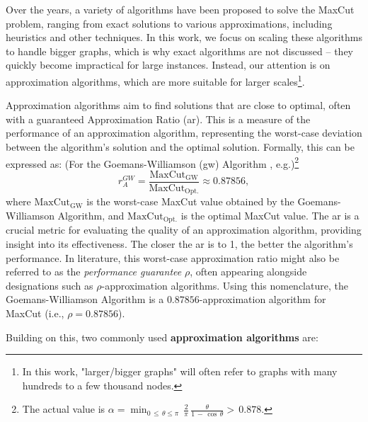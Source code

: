 
Over the years, a variety of algorithms have been proposed to solve the MaxCut problem, ranging from exact solutions to various approximations, including heuristics and other techniques. In this work, we focus on scaling these algorithms to handle bigger graphs, which is why exact algorithms are not discussed – they quickly become impractical for large instances. Instead, our attention is on approximation algorithms, which are more suitable for larger scales\footnote{In this work, "larger/bigger graphs" will often refer to graphs with many hundreds to a few thousand nodes.}.

Approximation algorithms aim to find solutions that are close to optimal, often with a guaranteed Approximation Ratio (\acrshort{ar}). This is a measure of the performance of an approximation algorithm, representing the worst-case deviation between the algorithm's solution and the optimal solution. Formally, this can be expressed as: (For the Goemans-Williamson (\acrshort{gw}) Algorithm \cite{GW-Algorithm}, e.g.)\footnote{The actual value is $\alpha=\operatorname*{min}_{0\,\leq\,\theta\leq\pi}\,\frac{2}{\pi}\,\frac{\theta}{1\,-\,\cos\,\theta} > \,0.878$.}$$r_A^{GW} = \frac{\text{MaxCut}_{\text{GW}}}{\text{MaxCut}_{\text{Opt.}}} \approx 0.87856,$$
where $\text{MaxCut}_{\text{GW}}$ is the worst-case MaxCut value obtained by the Goemans-Williamson Algorithm, and $\text{MaxCut}_{\text{Opt.}}$ is the optimal MaxCut value. The \acrshort{ar} is a crucial metric for evaluating the quality of an approximation algorithm, providing insight into its effectiveness. The closer the \acrshort{ar} is to 1, the better the algorithm's performance. In literature, this worst-case approximation ratio might also be referred to as the \textit{performance guarantee} $\rho$, often appearing alongside designations such as $\rho$-approximation algorithms. Using this nomenclature, the Goemans-Williamson Algorithm is a $0.87856$-approximation algorithm for MaxCut (i.e., $\rho = 0.87856$).

Building on this, two commonly used \textbf{approximation algorithms} are:

